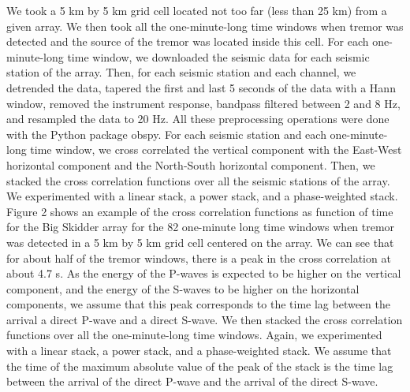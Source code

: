 \documentclass[draft]{agujournal2019}
\begin{document}
We took a 5 km by 5 km grid cell located not too far (less than 25 km) from a given array. We then took all the one-minute-long time windows when tremor was detected and the source of the tremor was located inside this cell. For each one-minute-long time window, we downloaded the seismic data for each seismic station of the array. Then, for each seismic station and each channel, we detrended the data, tapered the first and last 5 seconds of the data with a Hann window, removed the instrument response, bandpass filtered between 2 and 8 Hz, and resampled the data to 20 Hz. All these preprocessing operations were done with the Python package obspy. For each seismic station and each one-minute-long time window, we cross correlated the vertical component with the East-West horizontal component and the North-South horizontal component. Then, we stacked the cross correlation functions over all the seismic stations of the array. We experimented with a linear stack, a power stack, and a phase-weighted stack. Figure 2 shows an example of the cross correlation functions as function of time for the Big Skidder array for the 82 one-minute long time windows when tremor was detected in a 5 km by 5 km grid cell centered on the array. We can see that for about half of the tremor windows, there is a peak in the cross correlation at about 4.7 s. As the energy of the P-waves is expected to be higher on the vertical component, and the energy of the S-waves to be higher on the horizontal components, we assume that this peak corresponds to the time lag between the arrival a direct P-wave and a direct S-wave. We then stacked the cross correlation functions over all the one-minute-long time windows. Again, we experimented with a linear stack, a power stack, and a phase-weighted stack. We assume that the time of the maximum absolute value of the peak of the stack is the time lag between the arrival of the direct P-wave and the arrival of the direct S-wave. \\
\end{document}

